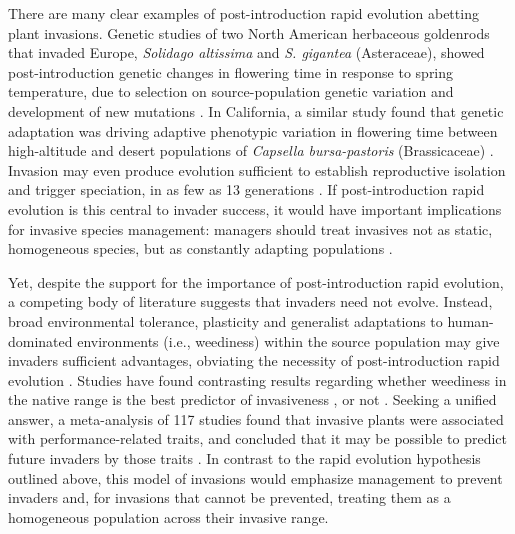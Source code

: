 \documentclass[12pt]{article}\usepackage[]{graphicx}\usepackage[]{color}
\begin{document}
	There are many clear examples of post-introduction rapid evolution abetting plant invasions. Genetic studies of two North American herbaceous goldenrods that invaded Europe, \textit{Solidago altissima} and \textit{S. gigantea} (Asteraceae), showed post-introduction genetic changes in flowering time in response to spring temperature, due to selection on source-population genetic variation and development of new mutations \parencite{Weber1998}. %
In California, a similar study found that genetic adaptation was driving adaptive phenotypic variation in flowering time between high-altitude and desert populations of \textit{Capsella bursa-pastoris} (Brassicaceae) \parencite{Linde2001}. Invasion may even produce evolution sufficient to establish reproductive isolation and trigger speciation, in as few as 13 generations \parencite{Hendry2000}. If post-introduction rapid evolution is this central to invader success, it would have important implications for invasive species management: managers should treat invasives not as static, homogeneous species, but as constantly adapting populations \parencite{Lee2002invasion}. %
	
	Yet, despite the support for the importance of post-introduction rapid evolution, a competing body of literature suggests that invaders need not evolve. Instead, broad environmental tolerance, plasticity and generalist adaptations to human-dominated environments (i.e., weediness) within the source population may give invaders sufficient advantages, obviating the necessity of post-introduction rapid evolution \parencite{Richards2006,Schwartz1994,Bock2015,Rejmanek1996,Baker1965}. %
	Studies have found contrasting results regarding whether weediness in the native range is the best predictor of invasiveness %
	\parencite[e.g.,][]{Maillet2000}, or not \parencite{Perrins1992,Mack1996}. Seeking a unified answer, a meta-analysis of 117 studies found that invasive plants were associated with performance-related traits, and concluded that it may be possible to predict future invaders by those traits \parencite{VanKleunen2010}. In contrast to the rapid evolution hypothesis outlined above, this model of invasions would emphasize management to prevent invaders and, for invasions that cannot be prevented, treating them as a homogeneous population across their invasive range.
\end{document}

